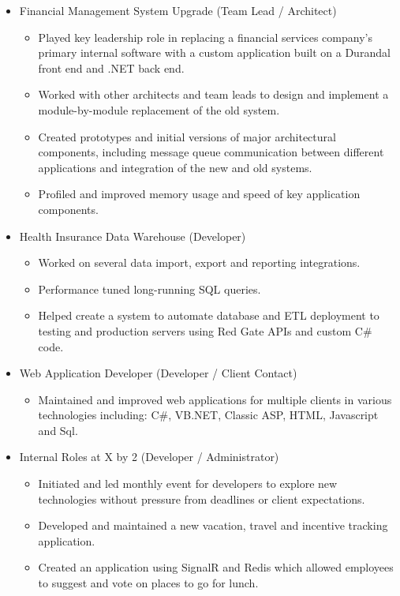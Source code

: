 \documentclass[12pt,letterpaper,sans]{moderncv}
\begin{document}
    \begin{itemize}[leftmargin=1.24in]
        \item Financial Management System Upgrade (Team Lead / Architect)
            \begin{itemize}
                \item Played key leadership role in replacing a financial services company's primary internal software with a custom application built on a Durandal front end and .NET back end.
                \item Worked with other architects and team leads to design and implement a module-by-module replacement of the old system.
                \item Created prototypes and initial versions of major architectural components, including message queue \mbox{communication} between different applications and integration of the new and old systems.
                \item Profiled and improved memory usage and speed of key application components.
            \end{itemize}
        \item Health Insurance Data Warehouse (Developer)
        	\begin{itemize}
	        	\item Worked on several data import, export and reporting integrations.
	        	\item Performance tuned long-running SQL queries.
	        	\item Helped create a system to automate database and ETL deployment to testing and production servers using Red Gate APIs and custom C\# code.
        	\end{itemize}
        \item Web Application Developer (Developer / Client Contact)
            \begin{itemize}
            	\item Maintained and improved web applications for multiple clients in various technologies including: C\#, VB.NET, Classic ASP, HTML, Javascript and Sql.
            \end{itemize}
        \item Internal Roles at X by 2 (Developer / Administrator)
            \begin{itemize}
            	\item Initiated and led monthly event for developers to explore new technologies without pressure from deadlines or client expectations.
                \item Developed and maintained a new vacation, travel and incentive tracking application.
                \item Created an application using SignalR and Redis which allowed employees to suggest and vote on places to go for lunch.
            \end{itemize}
    \end{itemize}
\end{document}
